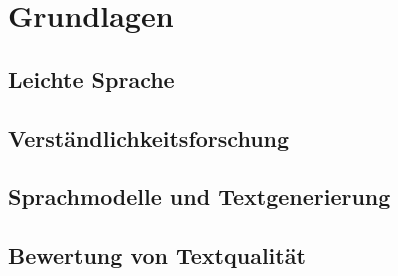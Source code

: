 
\chapter{Grundlagen}\label{ch:grundlagen}


\section{Leichte Sprache}


\section{Verständlichkeitsforschung}


\section{Sprachmodelle und Textgenerierung}


\section{Bewertung von Textqualität}
